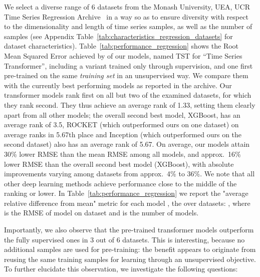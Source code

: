 \documentclass{article} \usepackage{iclr2021_conference,times}
\begin{document}
We select a diverse range of 6 datasets from the Monash University, UEA, UCR Time Series Regression Archive~\cite{regression_monash_2020} in a way so as to ensure diversity with respect to the dimensionality and length of time series samples, as well as the number of samples (see Appendix Table~\ref{tab:characteristics_regression_datasets} for dataset characteristics). Table~\ref{tab:performance_regression} shows the Root Mean Squared Error achieved by of our models, named TST for ``Time Series Transformer'', including a variant trained only through supervision, and one first pre-trained on the same \textit{training set} in an unsupervised way. We compare them with the currently best performing models as reported in the archive. Our transformer models rank first on all but two of the examined datasets, for which they rank second. They thus achieve an average rank of 1.33, setting them clearly apart from all other models; the overall second best model, XGBoost, has an average rank of 3.5, ROCKET (which outperformed ours on one dataset) on average ranks in 5.67th place and Inception (which outperformed ours on the second dataset) also has an average rank of 5.67. On average, our models attain 30\% lower RMSE than the mean RMSE among all models, and approx.\ 16\% lower RMSE than the overall second best model (XGBoost), with absolute improvements varying among datasets from approx.\ 4\% to 36\%. We note that all other deep learning methods achieve performance close to the middle of the ranking or lower. In Table~\ref{tab:performance_regression} we report the "average relative difference from mean" metric  for each model , the  over  datasets: , where  is the RMSE of model  on dataset  and  is the number of models.

Importantly, we also observe that the pre-trained transformer models outperform the fully supervised ones in 3 out of 6 datasets. This is interesting, because no additional samples are used for pre-training: the benefit appears to originate from reusing the same training samples for learning through an unsupervised objective. To further elucidate this observation, we investigate the following questions:
\end{document}

